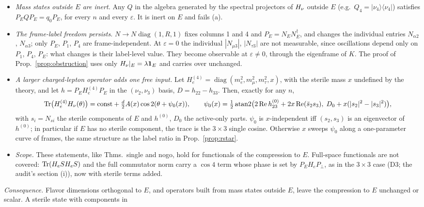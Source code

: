 \begin{itemize}
\item \emph{Mass states outside $E$ are inert.} Any $Q$ in the algebra generated by the spectral
  projectors of $H_\nu$ outside $E$ (e.g.\ $Q_4=|\nu_4\rangle\langle\nu_4|$) satisfies
  $P_EQP_E=q_0P_E$, for every $n$ and every $\varepsilon$. It is inert on $E$ and fails (a).
\item \emph{The frame-label freedom persists.} $N\to N\operatorname{diag}(1,R,1)$ fixes columns 1
  and 4 and $P_E=N_EN_E^\dagger$, and changes the individual entries $N_{\alpha2}$, $N_{\alpha3}$;
  only $P_E$, $P_1$, $P_4$ are frame-independent. At $\varepsilon=0$ the individual $|N_{\mu3}|$,
  $|N_{\tau3}|$ are not measurable, since oscillations depend only on $P_1$, $P_4$, $P_E$: what
  changes is their label-level value. They become observable at $\varepsilon\neq0$, through the
  eigenframe of $K$. The proof of Prop.~\ref{prop:obstruction} uses only $H_\nu|_E=\lambda\mathbf 1_E$
  and carries over unchanged.
\item \emph{A larger charged-lepton operator adds one free input.} Let
  $H_e^{(4)}=\operatorname{diag}(m_e^2,m_\mu^2,m_\tau^2,x)$, with the sterile mass $x$ undefined by
  the theory, and let $h=P_EH_e^{(4)}P_E$ in the $(\nu_2,\nu_3)$ basis, $D=h_{22}-h_{33}$. Then,
  exactly for any $n$,
  \[
    \operatorname{Tr}\!\big(H_e^{(4)}H_\nu(\theta)\big)=\mathrm{const}+\tfrac{d}{2}A(x)\cos2(\theta+\psi_0(x)),
    \qquad
    \psi_0(x)=\tfrac12\operatorname{atan2}\!\big(2\operatorname{Re}h^{(0)}_{23}
      +2x\operatorname{Re}(\bar s_2s_3),\;D_0+x(|s_2|^2-|s_3|^2)\big),
  \]
  with $s_i=N_{si}$ the sterile components of $E$ and $h^{(0)}$, $D_0$ the active-only parts.
  $\psi_0$ is $x$-independent iff $(s_2,s_3)$ is an eigenvector of $h^{(0)}$; in particular if $E$
  has no sterile component, the trace is the $3\times3$ single cosine. Otherwise $x$ sweeps
  $\psi_0$ along a one-parameter curve of frames, the same structure as the label ratio in
  Prop.~\ref{prop:rstar}.
\item \emph{Scope.} These statements, like Thms.~single and nogo, hold for functionals of the
  compression to $E$. Full-space functionals are not covered: $\operatorname{Tr}(H_eSH_eS)$ and the full
  commutator norm carry a $\cos4$ term whose phase is set by $P_EH_eP_\perp$, as in the
  $3\times3$ case (D3; the audit's section (i)), now with sterile terms added.
\end{itemize}
\emph{Consequence.} Flavor dimensions orthogonal to $E$, and operators built from mass states
outside $E$, leave the compression to $E$ unchanged or scalar. A sterile state with components in
